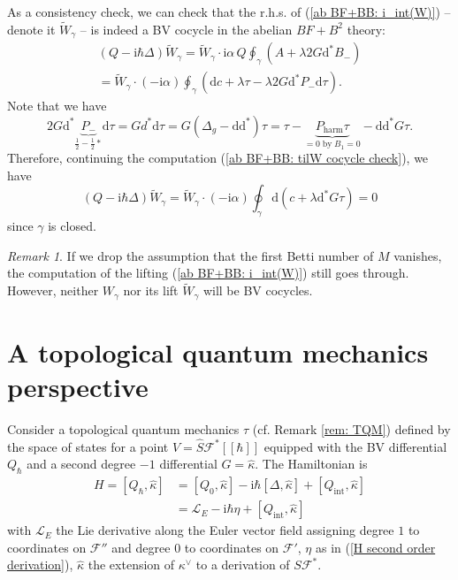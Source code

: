 \documentclass{amsart}
\theoremstyle{plain} %
\theoremstyle{definition}
\theoremstyle{remark}
\newtheorem{rem}[thm]{Remark}
\newcommand{\mr}{\mathrm}
\newcommand{\wh}{\widehat}
\newcommand{\til}{\widetilde}
\newcommand{\F}{\mathcal{F}}
\newcommand{\LL}{\mathcal{L}}
\newcommand{\dd}{\partial}
\newcommand{\ii}{\mathrm{int}}
\newcommand{\iii}{\mathrm{i}}
\newcommand{\fun}{\widehat{S}\mathcal{F}^*[[\hbar]]}
\newcommand{\dr}{\mathrm{d}}
\begin{document}
As a consistency check, we can check that the r.h.s. of (\ref{ab BF+BB: i_int(W)}) -- denote it $\til{W}_\gamma$ -- is indeed a BV cocycle in the abelian $BF+B^2$ theory:
\begin{multline}\label{ab BF+BB: tilW cocycle check}
    (Q-\iii\hbar \Delta)\til{W}_\gamma
    = 
    \til{W}_\gamma\cdot \iii\alpha\, Q\oint_\gamma \left(A+\lambda 2 G \dr^*B_-\right)\\=
    \til{W}_\gamma\cdot (-\iii\alpha) \oint_\gamma \left(\dr c+\lambda\tau -\lambda 2G \dr^* P_- \dr\tau\right).
\end{multline}
Note that we have
\begin{equation}
    2G\dr^* \underbrace{P_-}_{\frac12-\frac12*}\dr\tau=Gd^*\dr\tau = G(\Delta_g-\dr \dr^*)\tau= \tau-\underbrace{P_\mr{harm}\tau}_{=0\;\mr{by\;}B_1=0} -\dr \dr^*G\tau.
\end{equation}
Therefore, continuing the computation (\ref{ab BF+BB: tilW cocycle check}), we have
\begin{equation}
    (Q-\iii\hbar \Delta)\til{W}_\gamma= \til{W}_\gamma\cdot (-\iii\alpha)\oint_\gamma \dr(c+\lambda \dr^* G\tau) =0
\end{equation}
since $\gamma$ is closed.

\begin{rem}
    If we drop the assumption that the first Betti number of $M$ vanishes, the computation of the lifting (\ref{ab BF+BB: i_int(W)}) still goes through. However, neither $W_\gamma$ nor its lift $\til{W}_\gamma$ will be BV cocycles.
\end{rem}



\section{A topological quantum mechanics perspective}
\label{ss: TQM perspective}
Consider a topological quantum mechanics $\tau$ (cf. Remark \ref{rem: TQM}) defined by the space of states for a point $V=\fun$ equipped with the BV differential $Q_\hbar$ and a second degree $-1$ differential $G=\wh\kappa$. The Hamiltonian is
\begin{equation}\label{Hhat}
\begin{aligned}
    H=[Q_\hbar,\wh\kappa]&= [Q_0,\wh\kappa]-\iii\hbar [\Delta,\wh\kappa]+ [Q_\ii,\wh\kappa]\\
    &=\LL_E-\iii\hbar \eta + [Q_\ii,\wh\kappa]
\end{aligned}
\end{equation}
with $\LL_E$ the Lie derivative along the Euler vector field assigning degree $1$ to coordinates on  $\F''$ and degree $0$ to coordinates on $\F'$, $\eta
$
as in (\ref{H second order derivation}), $\wh\kappa$ the extension of $\kappa^\vee$ to a derivation of $S\F^*$.
\end{document}
